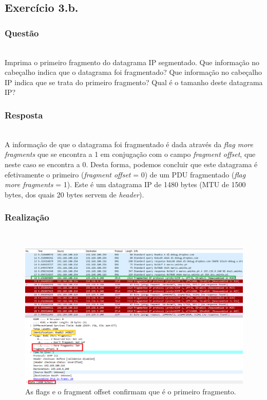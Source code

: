\documentclass{llncs}
\begin{document}
\subsection{Exercício 3.b.}
\subsubsection{Questão}\rule[-10pt]{0pt}{10pt}\\

Imprima o primeiro fragmento do datagrama IP segmentado. Que informação no cabeçalho indica que o datagrama foi fragmentado? Que informação no cabeçalho IP indica que se trata do primeiro fragmento? Qual é o tamanho deste datagrama IP?

\subsubsection{Resposta}\rule[-10pt]{0pt}{10pt}\\

A informação de que o datagrama foi fragmentado é dada através da \textit{flag more fragments} que se encontra a 1 em conjugação com o campo \textit{fragment offset}, que neste caso se encontra a 0. Desta forma, podemos concluir que este datagrama é efetivamente o primeiro (\textit{fragment offset} = 0) de um PDU fragmentado (\textit{flag more fragments} = 1). Este é um datagrama IP de 1480 bytes (MTU de 1500 bytes, dos quais 20 bytes servem de \textit{header}). 

\subsubsection{Realização}\rule[-10pt]{0pt}{10pt}\\

\begin{figure}
	\begin{center}
	\includegraphics[scale=0.35]{./imagens/packet_first.png} 
	\end{center}
	\caption{\label{fig:packet_first}As flags e o fragment offset confirmam que é o primeiro fragmento.}
\end{figure} 
\end{document}
